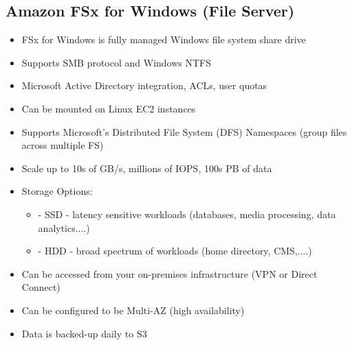 \subsection{Amazon FSx for Windows (File Server)}
\begin{itemize}
    \item FSx for Windows is fully managed Windows file system share drive
    \item Supports SMB protocol and Windows NTFS
    \item Microsoft Active Directory integration, ACLs, user quotas
    \item Can be mounted on Linux EC2 instances
    \item Supports Microsoft's Distributed File System (DFS) Namespaces (group files across multiple FS)
    \item Scale up to 10s of GB/s, millions of IOPS, 100s PB of data
    \item Storage Options:
    \begin{itemize}
        \item- SSD - latency sensitive workloads (databases, media processing, data analytics....)
        \item- HDD - broad spectrum of workloads (home directory, CMS,....)
    \end{itemize}
    \item Can be accessed from your on-premises infrastructure (VPN or Direct Connect)
    \item Can be configured to be Multi-AZ (high availability)
    \item Data is backed-up daily to S3
\end{itemize}

